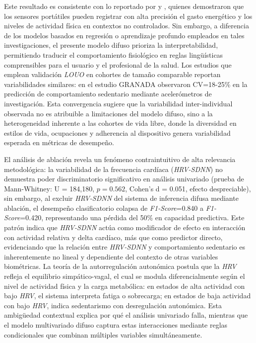 Este resultado es consistente con lo reportado por \cite{Doherty2021} y \cite{Strain2020}, quienes demostraron que los sensores portátiles pueden registrar con alta precisión el gasto energético y los niveles de actividad física en contextos no controlados. Sin embargo, a diferencia de los modelos basados en regresión o aprendizaje profundo empleados en tales investigaciones, el presente modelo difuso prioriza la interpretabilidad, permitiendo traducir el comportamiento fisiológico en reglas lingüísticas comprensibles para el usuario y el profesional de la salud. Los estudios que emplean validación \textit{LOUO} en cohortes de tamaño comparable reportan variabilidades similares: \cite{Migueles2022GRANADA} en el estudio GRANADA observaron CV=18-25\% en la predicción de comportamiento sedentario mediante acelerómetros de investigación. Esta convergencia sugiere que la variabilidad inter-individual observada no es atribuible a limitaciones del modelo difuso, sino a la heterogeneidad inherente a las cohortes de vida libre, donde la diversidad en estilos de vida, ocupaciones y adherencia al dispositivo genera variabilidad esperada en métricas de desempeño.


El análisis de ablación revela un fenómeno contraintuitivo de alta relevancia metodológica: la variabilidad de la frecuencia cardíaca (\textit{HRV-SDNN}) no demuestra poder discriminatorio significativo en análisis univariado (prueba de Mann-Whitney: U = 184,180, $p=0.562$, Cohen's d = 0.051, efecto despreciable), sin embargo, al excluir \textit{HRV-SDNN} del sistema de inferencia difusa mediante ablación, el desempeño clasificatorio colapsa de \textit{F1-Score}=0.840 a \textit{F1-Score}=0.420, representando una pérdida del 50\% en capacidad predictiva. Este patrón indica que \textit{HRV-SDNN} actúa como modificador de efecto en interacción con actividad relativa y delta cardíaco, más que como predictor directo, evidenciando que la relación entre \textit{HRV-SDNN} y comportamiento sedentario es inherentemente no lineal y dependiente del contexto de otras variables biométricas. La teoría de la autorregulación autonómica postula que la \textit{HRV} refleja el equilibrio simpático-vagal, el cual se modula diferencialmente según el nivel de actividad física y la carga metabólica: en estados de alta actividad con bajo \textit{HRV}, el sistema interpreta fatiga o sobrecarga; en estados de baja actividad con bajo \textit{HRV}, indica sedentarismo con desregulación autonómica. Esta ambigüedad contextual explica por qué el análisis univariado falla, mientras que el modelo multivariado difuso captura estas interacciones mediante reglas condicionales que combinan múltiples variables simultáneamente.

